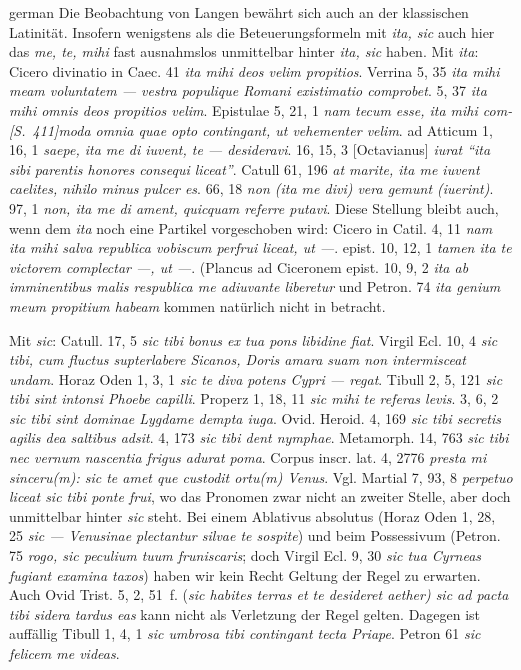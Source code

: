 \begin{otherlanguage*}{german}
Die Beobachtung von Langen bewährt sich auch an der klassischen Latinität. Insofern wenigstens als die Beteuerungsformeln mit \emph{ita, sic} auch hier das \emph{me, te, mihi} fast ausnahmslos unmittelbar hinter \emph{ita, sic} haben. Mit \emph{ita}: Cicero divinatio in Caec. 41 \emph{ita mihi deos velim propitios}. Verrina 5, 35 \emph{ita mihi meam voluntatem — vestra populique Romani existimatio comprobet}. 5, 37 \emph{ita mihi omnis deos propitios velim}. Epistulae 5, 21, 1 \emph{nam tecum esse, ita mihi com-}\hypertarget{p411}{\emph{[S.~411]}}\label{p411}\emph{moda omnia quae opto contingant, ut vehementer velim}. ad Atticum 1, 16, 1 \emph{saepe, ita me di iuvent, te — desideravi}. 16, 15, 3 [Octavianus] \emph{iurat “ita sibi parentis honores consequi liceat”}. Catull 61, 196 \emph{at marite, ita me iuvent caelites, nihilo minus pulcer es}. 66, 18 \emph{non (ita me divi) vera gemunt (iuerint)}. 97, 1 \emph{non, ita me di ament, quicquam referre putavi}. Diese Stellung bleibt auch, wenn dem \emph{ita} noch eine Partikel vorgeschoben wird: Cicero in Catil. 4, 11 \emph{nam ita mihi salva republica vobiscum perfrui liceat, ut —}. epist. 10, 12, 1 \emph{tamen ita te victorem complectar —, ut —}. (Plancus ad Ciceronem epist. 10, 9, 2 \emph{ita ab imminentibus malis respublica me adiuvante liberetur} und Petron. 74 \emph{ita genium meum propitium habeam} kommen natürlich nicht in betracht.

Mit \emph{sic}: Catull. 17, 5 \emph{sic tibi bonus ex tua pons libidine fiat}. Virgil Ecl. 10, 4 \emph{sic tibi, cum fluctus supterlabere Sicanos, Doris amara suam non intermisceat undam}. Horaz Oden 1, 3, 1 \emph{sic te diva potens Cypri — regat}. Tibull 2, 5, 121 \emph{sic tibi sint intonsi Phoebe capilli}. Properz 1, 18, 11 \emph{sic mihi te referas levis}. 3, 6, 2 \emph{sic tibi sint dominae Lygdame dempta iuga}. Ovid. Heroid. 4, 169 \emph{sic tibi secretis agilis dea saltibus adsit}. 4, 173 \emph{sic tibi dent nymphae}. Metamorph. 14, 763 \emph{sic tibi nec vernum nascentia frigus adurat poma}. Corpus inscr. lat. 4, 2776 \emph{presta mi sinceru(m): sic te amet que custodit ortu(m) Venus}. Vgl. Martial 7, 93, 8 \emph{perpetuo liceat sic tibi ponte frui}, wo das Pronomen zwar nicht an zweiter Stelle, aber doch unmittelbar hinter \emph{sic} steht. Bei einem Ablativus absolutus (Horaz Oden 1, 28, 25 \emph{sic — Venusinae plectantur silvae te sospite}) und beim Possessivum (Petron. 75 \emph{rogo, sic peculium tuum fruniscaris}; doch Virgil Ecl. 9, 30 \emph{sic tua Cyrneas fugiant examina taxos}) haben wir kein Recht Geltung der Regel zu erwarten. Auch Ovid Trist. 5, 2, 51~f. (\emph{sic habites terras et te desideret aether) sic ad pacta tibi sidera tardus eas} kann nicht als Verletzung der Regel gelten. Dagegen ist auffällig Tibull 1, 4, 1 \emph{sic umbrosa tibi contingant tecta Priape}. Petron 61 \emph{sic felicem me videas}.


\end{otherlanguage*}
